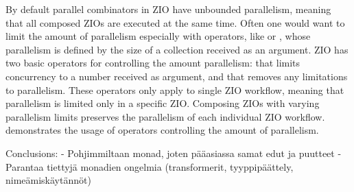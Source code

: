 

By default parallel combinators in ZIO have unbounded parallelism, meaning that all composed ZIOs are executed at the same time. Often one would want to limit the amount of parallelism especially with operators, like  or , whose parallelism is defined by the size of a collection received as an argument. ZIO has two basic operators for controlling the amount parallelism:  that limits concurrency to a number received as argument, and  that removes any limitations to parallelism. These operators only apply to single ZIO workflow, meaning that parallelism is limited only in a specific ZIO. Composing ZIOs with varying parallelism limits preserves the parallelism of each individual ZIO workflow.  demonstrates the usage of operators controlling the amount of parallelism.



Conclusions: 
- Pohjimmiltaan monad, joten pääasiassa samat edut ja puutteet
- Parantaa tiettyjä monadien ongelmia (transformerit, tyyppipäättely, nimeämiskäytännöt)

